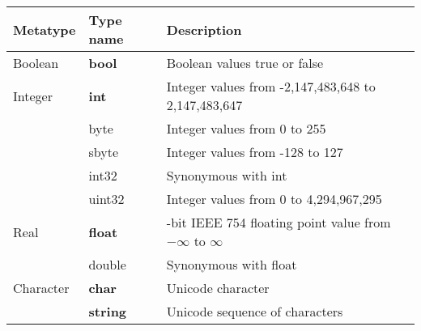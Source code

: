 \begin{table}
  \centering
  \begin{tabularx}{\textwidth}{|l|l|>{\raggedright\arraybackslash}X|}
    \hline
    \rowcolor{headerRowColor} Metatype & Type name & Description\\
    \hline
    Boolean & \textbf{bool} & Boolean values true or false \\
    \hline
    Integer & \textbf{int} & Integer values from -2,147,483,648 to 2,147,483,647 \\
             & byte &Integer values from 0 to 255\\
             & sbyte &Integer values from -128 to 127\\
             & int32 &Synonymous with int\\
             & uint32 & Integer values from 0 to 4,294,967,295\\
    \hline
    Real &\textbf{float} & 64-bit IEEE 754 floating point value from $-\infty$ to $\infty$\\
             & double & Synonymous with float\\
    \hline
    Character &\textbf{char} &Unicode character\\
             &\textbf{string} & Unicode sequence of characters\\

\end{tabularx}
\end{table}
